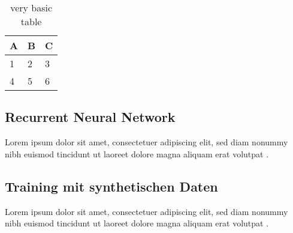 \begin{table}[h]
\centering
\begin{tabular}{l | l | l}
A & B & C \\
\hline
1 & 2 & 3 \\
4 & 5 & 6
\end{tabular}
\caption{very basic table}
\label{tab:abc}
\end{table}


\subsection{Recurrent Neural Network}
\label{grundlagen_nn_rnn}

Lorem ipsum dolor sit amet, consectetuer adipiscing elit, sed diam nonummy nibh euismod tincidunt ut laoreet dolore magna aliquam erat volutpat \cite{latexcompanion}. 


\subsection{Training mit synthetischen Daten}
\label{grundlagen_nn_synthetisch}

Lorem ipsum dolor sit amet, consectetuer adipiscing elit, sed diam nonummy nibh euismod tincidunt ut laoreet dolore magna aliquam erat volutpat \cite{latexcompanion}. 


